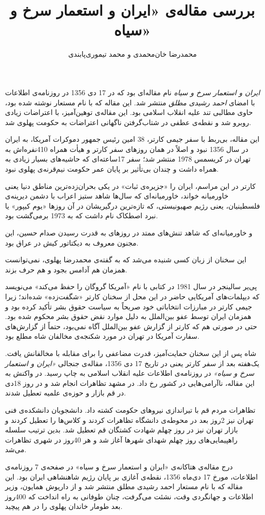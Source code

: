 \documentclass{article}
\author{محمدرضا خان‌محمدی و محمد تیموری‌پابندی}
\title{بررسی مقاله‌ی «ایران و استعمار سرخ و سیاه»}
\begin{document}
\maketitle
\textit{ایران و استعمار سرخ و سیاه}
نام مقاله‌ای بود که در 17 دی 1356 در روزنامه‌ی اطلاعات با امضای
\textit{احمد رشیدی مطلق}
منتشر شد. این مقاله که با نام مستعار نوشته شده بود، حاوی مطالبی تند علیه انقلاب اسلامی بود. این مقاله‌ی توهین‌آمیز، با اعتراضات زیادی روبرو شد و نقطه‌ی عطفی در شتاب‌گرفتن ناگهانی اعتراضات به حکومت پهلوی شد.
\par
این مقاله، بی‌ربط با سفر جیمی کارتر، 38 امین رئیس جمهور دموکرات آمریکا، به ایران در سال 1356 نبود و اصلاً در همان روزهای سفر کارتر و هیأت همراه 410نفره‌اش به تهران در کریسمس 1978 منتشر شد؛ سفر 17ساعته‌ای که حاشیه‌های بسیار زیادی به همراه داشت و چندان بی‌تأثیر بر پایان عمر حکومت نیم‌قرنه‌ی پهلوی نبود.
\par
کارتر در این مراسم، ایران را «جزیره‌ی ثبات»
در یکی بحران‌زده‌ترین مناطق دنیا یعنی خاورمیانه خواند، خاورمیانه‌ای که سال‌ها شاهد ستیز اعراب با دشمن دیرینه‌ی فلسطینیان، یعنی رژیم صهیونیستی، که تازه‌ترین درگیریشان در آن روز‌ها «یوم کیپور» یا نبرد اصطکاک نام داشت که به 1973 برمی‌گشت بود.
\par
و خاورمیانه‌ای که شاهد تنش‌های ممتد در روزهای به قدرت رسیدن صدام حسین، این مجنون معروف به دیکتاتور کیش در عراق بود.
\par
این سخنان از زبان کسی شنیده می‌شد که به گفته‌ی محمدرضا پهلوی، نمی‌توانست همزمان هم آدامس بجود و هم حرف بزند.
\par
پی‌یر سالینجر
در سال 1981 در کتابی با نام «آمریکا گروگان را حفظ می‌کند»
می‌نویسد که دیپلمات‌های آمریکایی حاضر در این محل از سخنان کارتر «شگفت‌زده» شده‌اند؛ زیرا جیمی کارتر در مبارزات انتخاباتی خود صریحاً به سیاست حقوق بشر تأکید کرده بود و همزمان ایران توسط عفو بین‌الملل به دلیل موارد نقض حقوق بشر محکوم شده بود. حتی در صورتی هم که کارتر از گزارش عفو بین‌الملل آگاه نمی‌بود، حتماً از گزارش‌های سفارت آمریکا در تهران در مورد شکنجه‌ی مخالفان شاه مطلع بود.
\par
شاه پس از این سخنان حمایت‌آمیز، قدرت مضاعفی را برای مقابله با مخالفانش یافت. یک‌هفته بعد از سفر کارتر یعنی در تاریخ 17 دی 1356، مقاله‌ی جنجالی \textit{«ایران و استعمار سرخ و سیاه»} در روزنامه‌ی اطلاعات علیه انقلاب اسلامی به چاپ رسید. در واکنش به این مقاله، ناآرامی‌هایی در کشور رخ داد. در مشهد تظاهرات انجام شد و در روز 18دی در قم بازار و حوزه‌ی علمیه تعطیل شدند.
\par
تظاهرات مردم قم با تیراندازی نیروهای حکومت کشته داد. دانشجویان دانشکده‌ی فنی تهران نیز 2روز بعد در محوطه‌ی دانشگاه تظاهرات کردند و کلاس‌ها را تعطیل کردند و بازار تهران نیز در روز چهلم شهادت کشتگان قم تعطیل شد. بدین ترتیب سلسله راهپیمایی‌های روز چهلم شهدای شهرها آغاز شد و هر 40روز در شهری تظاهرات می‌شد.
\par
درج مقاله‌ی هتاکانه‌ی «ایران و استعمار سرخ و سیاه» در صفحه‌ی 7 روزنامه‌ی اطلاعات، مورخ 17 دی‌ماه 1356، نقطه‌ی آغازی بر پایان رژیم شاهنشاهی ایران بود. این مقاله که با نام مستعار احمد رشیدی مطلق منتشر شد و از داریوش همایون، وزیر اطلاعات و جهانگردی وقت، نشئت می‌گرفت، چنان طوفانی به راه انداخت که 400روز بعد طومار خاندان پهلوی را در هم پیچید.
\end{document}
